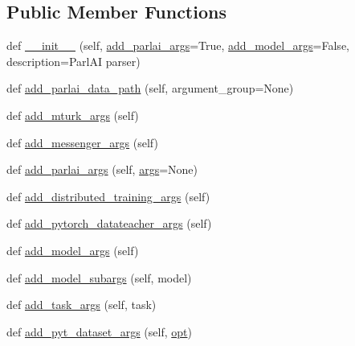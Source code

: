 \subsection*{Public Member Functions}
\begin{DoxyCompactItemize}
\item 
def \hyperlink{classparlai_1_1core_1_1params_1_1ParlaiParser_ab1d55b343c804984783548bec009a695}{\+\_\+\+\_\+init\+\_\+\+\_\+} (self, \hyperlink{classparlai_1_1core_1_1params_1_1ParlaiParser_a3dfaa7781346d8c974d60684e81cb705}{add\+\_\+parlai\+\_\+args}=True, \hyperlink{classparlai_1_1core_1_1params_1_1ParlaiParser_af05d40e27abb0740948fdccfde5b8808}{add\+\_\+model\+\_\+args}=False, description=\textquotesingle{}Parl\+AI parser\textquotesingle{})
\item 
def \hyperlink{classparlai_1_1core_1_1params_1_1ParlaiParser_a896033a34a5e5e1bbc081d99e9835d6b}{add\+\_\+parlai\+\_\+data\+\_\+path} (self, argument\+\_\+group=None)
\item 
def \hyperlink{classparlai_1_1core_1_1params_1_1ParlaiParser_a6043b5b5c36f99f85a9791dd8dc35551}{add\+\_\+mturk\+\_\+args} (self)
\item 
def \hyperlink{classparlai_1_1core_1_1params_1_1ParlaiParser_aed38c7346112f11851969224cb25ad1e}{add\+\_\+messenger\+\_\+args} (self)
\item 
def \hyperlink{classparlai_1_1core_1_1params_1_1ParlaiParser_a3dfaa7781346d8c974d60684e81cb705}{add\+\_\+parlai\+\_\+args} (self, \hyperlink{classparlai_1_1core_1_1params_1_1ParlaiParser_a27d35bfa073588bf887cbdbf45c19f39}{args}=None)
\item 
def \hyperlink{classparlai_1_1core_1_1params_1_1ParlaiParser_a718f9802eec8bcac25866900d2ae69b0}{add\+\_\+distributed\+\_\+training\+\_\+args} (self)
\item 
def \hyperlink{classparlai_1_1core_1_1params_1_1ParlaiParser_a037989eca768126b981270b2bdf06b0c}{add\+\_\+pytorch\+\_\+datateacher\+\_\+args} (self)
\item 
def \hyperlink{classparlai_1_1core_1_1params_1_1ParlaiParser_af05d40e27abb0740948fdccfde5b8808}{add\+\_\+model\+\_\+args} (self)
\item 
def \hyperlink{classparlai_1_1core_1_1params_1_1ParlaiParser_a46c57cd479d8780c4c22aecb3135d5fe}{add\+\_\+model\+\_\+subargs} (self, model)
\item 
def \hyperlink{classparlai_1_1core_1_1params_1_1ParlaiParser_a61ff766a70bd11365cbcbf71431ce527}{add\+\_\+task\+\_\+args} (self, task)
\item 
def \hyperlink{classparlai_1_1core_1_1params_1_1ParlaiParser_a7d85a5e2fac2c1e8f0f75a4255850b9b}{add\+\_\+pyt\+\_\+dataset\+\_\+args} (self, \hyperlink{classparlai_1_1core_1_1params_1_1ParlaiParser_aa7c461e146b468d033fea1d1dcd92bcf}{opt})

\end{DoxyCompactItemize}
